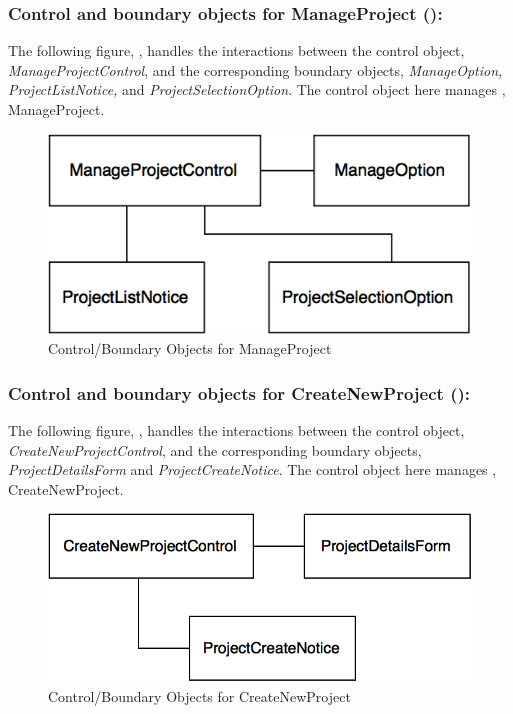 \documentclass[12pt,letterpaper]{article}
\begin{document}
\subsubsection*{Control and boundary objects for ManageProject ():}

The following figure, , handles the interactions between the control object, {\it ManageProjectControl}, and the corresponding boundary objects, {\it ManageOption, ProjectListNotice,} and {\it ProjectSelectionOption}. The control object here manages , ManageProject.

\vspace{1em}

\begin{figure}[H]
	\centering{}
	\includegraphics[scale=0.37]{imgs/cbod/manage-project.png}
	\caption{Control/Boundary Objects for ManageProject}
\end{figure}

\newpage{}

\subsubsection*{Control and boundary objects for CreateNewProject ():}

The following figure, , handles the interactions between the control object, {\it CreateNewProjectControl}, and the corresponding boundary objects, {\it ProjectDetailsForm} and {\it ProjectCreateNotice}. The control object here manages , CreateNewProject.

\begin{figure}[H]
	\centering{}
	\includegraphics[scale=0.37]{imgs/cbod/create-new-project.png}
	\caption{Control/Boundary Objects for CreateNewProject}
\end{figure}
\end{document}
